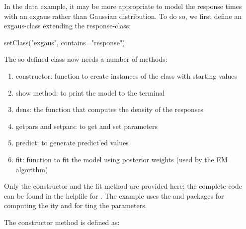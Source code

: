 \documentclass[article]{jss}
\begin{document}
In the  data example, it may be more appropriate to model
the response times with an exgaus rather than Gaussian distribution.  
To do so, we first define an exgaus-class extending the response-class:
\begin{CodeChunk}
\begin{CodeInput}
setClass("exgaus", contains="response")
\end{CodeInput}
\end{CodeChunk}

The so-defined class now needs a number of methods: 
\begin{enumerate}
	\item constructor: function to create instances of the class 
	with starting values
	\item show method: to print the model to the terminal
	\item dens: the function that computes the density of the responses
	\item getpars and setpars: to get and set parameters 
	\item predict: to generate predict'ed values 
	\item fit: function to fit the model using posterior weights (used 
	by the EM algorithm)
\end{enumerate}

Only the constructor and the fit method are provided here; the complete code 
can be found in the helpfile for . 
The  example uses the  and  
packages \citep{Stasinopoulos2009a,Stasinopoulos2009b} for 
computing the ity and for ting the parameters. 

The constructor method is defined as: 
\begin{CodeChunk}
\end{CodeChunk}
\end{document}
